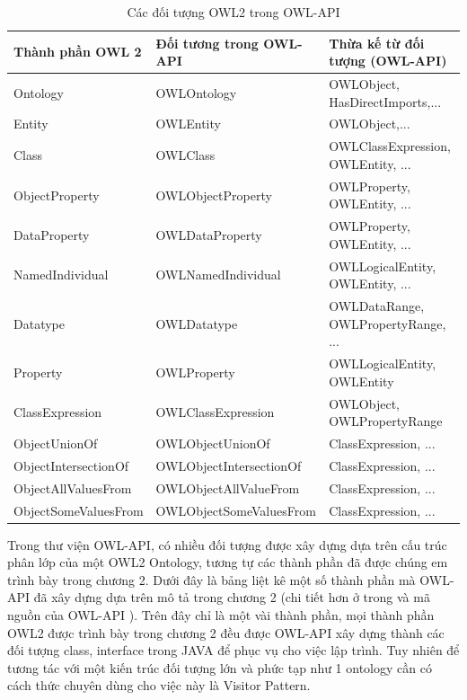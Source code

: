 \begin{table}[h]
	\centering
	\begin{tabular}{|l|l|p{4cm}|}
		\hline
		Thành phần OWL 2 		& Đối tương trong OWL-API 		& Thừa kế từ đối tượng (OWL-API) \\
		\hline
		Ontology 				& OWLOntology 					& OWLObject, HasDirectImports,...  \\ 
		\hline
		Entity 					& OWLEntity 					& OWLObject,...  \\
		\hline
		Class 					& OWLClass 						& OWLClassExpression, OWLEntity, ...   \\		
		\hline
		ObjectProperty 			& OWLObjectProperty 			& OWLProperty, OWLEntity, ...   \\		
		\hline
		DataProperty 			& OWLDataProperty 				& OWLProperty, OWLEntity, ...   \\
		\hline
		NamedIndividual 		& OWLNamedIndividual			& OWLLogicalEntity, OWLEntity, ...  \\
		\hline
		Datatype 				& OWLDatatype 					& OWLDataRange, OWLPropertyRange, ...   \\
		\hline
		Property 				& OWLProperty 					& OWLLogicalEntity, OWLEntity   \\
		\hline
		ClassExpression			& OWLClassExpression			& OWLObject, OWLPropertyRange   \\
		\hline
		ObjectUnionOf			& OWLObjectUnionOf				& ClassExpression, ...\\
		\hline
		ObjectIntersectionOf	& OWLObjectIntersectionOf		& ClassExpression, ... \\
		\hline
		ObjectAllValuesFrom		& OWLObjectAllValueFrom		& ClassExpression, ... \\
		\hline
		ObjectSomeValuesFrom	& OWLObjectSomeValuesFrom		& ClassExpression, ... \\
		\hline
	\end{tabular}
	\caption{Các đối tượng OWL2 trong OWL-API\label{overflow}}
\end{table}
Trong thư viện OWL-API, có nhiều đối tượng được xây dựng dựa trên cấu trúc phân lớp của một OWL2 Ontology, tương tự các thành phần đã được chúng em trình bày trong chương 2. Dưới đây là bảng liệt kê một số thành phần mà OWL-API đã xây dựng dựa trên mô tả trong chương 2 (chi tiết hơn ở trong \cite{owl2spec} và mã nguồn của OWL-API \cite{owlapi}). Trên đây chỉ là một vài thành phần, mọi thành phần OWL2 được trình bày trong chương 2 đều được OWL-API xây dựng thành các đối tượng class, interface trong JAVA để phục vụ cho việc lập trình. Tuy nhiên để tương tác với một kiến trúc đối tượng lớn và phức tạp như 1 ontology cần có cách thức chuyên dùng cho việc này là Visitor Pattern.
